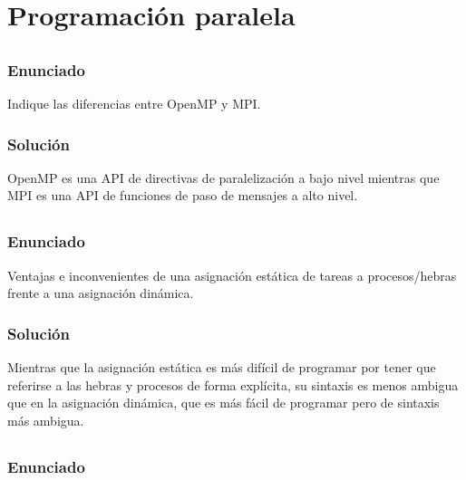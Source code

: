\chapter{Programación paralela}

\section{}\label{ej-2-1}

\subsection{Enunciado}

Indique las diferencias entre OpenMP y MPI\@.

\subsection{Solución}

OpenMP es una API de directivas de paralelización a bajo nivel mientras que MPI es una API de funciones de paso de mensajes a alto nivel.

\section{}\label{ej-2-2}

\subsection{Enunciado}

Ventajas e inconvenientes de una asignación estática de tareas a procesos/hebras frente a una asignación dinámica.

\subsection{Solución}

Mientras que la asignación estática es más difícil de programar por tener que referirse a las hebras y procesos de forma explícita, su sintaxis es menos ambigua que en la asignación dinámica, que es más fácil de programar pero de sintaxis más ambigua.

\section{}\label{ej-2-3}

\subsection{Enunciado}

